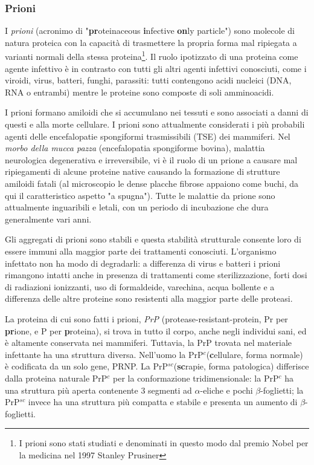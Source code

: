 {{\subsubsection{Prioni}
\par I \textit{prioni} (acronimo di "\textbf{pr}oteinaceous \textbf{i}nfective \textbf{on}ly particle") sono molecole di natura proteica con la capacità di trasmettere la propria forma mal ripiegata a varianti normali della stessa proteina\footnote{I prioni sono stati studiati e denominati in questo modo dal premio Nobel per la medicina nel 1997 Stanley Prusiner\supercite{prusiner1998prion}}. Il ruolo ipotizzato di una proteina come agente infettivo è in contrasto con tutti gli altri agenti infettivi conosciuti, come i viroidi, virus, batteri, funghi, parassiti: tutti contengono acidi nucleici (DNA, RNA o entrambi) mentre le proteine sono composte di soli amminoacidi.

\par I prioni formano amiloidi che si accumulano nei tessuti e sono associati a danni di questi e alla morte cellulare. I prioni sono attualmente considerati i più probabili agenti delle encefalopatie spongiformi trasmissibili (TSE) dei mammiferi. Nel \textit{morbo della mucca pazza} (encefalopatia spongiforme bovina), malattia neurologica degenerativa e irreversibile, vi è il ruolo di un prione a causare mal ripiegamenti di alcune proteine native causando la formazione di strutture amiloidi fatali (al microscopio le dense placche fibrose appaiono come buchi, da qui il caratteristico aspetto "a spugna"). Tutte le malattie da prione sono attualmente inguaribili e letali, con un periodo di incubazione che dura generalmente vari anni.

\par Gli aggregati di prioni sono stabili e questa stabilità strutturale consente loro di essere immuni alla maggior parte dei trattamenti conosciuti. L'organismo infettato non ha modo di degradarli: a differenza di virus e batteri i prioni rimangono intatti anche in presenza di trattamenti come sterilizzazione, forti dosi di radiazioni ionizzanti, uso di formaldeide, varechina, acqua bollente e a differenza delle altre proteine sono resistenti alla maggior parte delle proteasi.

\par La proteina di cui sono fatti i prioni, \textit{PrP} (protease-resistant-protein, Pr per \textbf{pr}ione, e P per \textbf{p}roteina), si trova in tutto il corpo, anche negli individui sani, ed è altamente conservata nei mammiferi. Tuttavia, la PrP trovata nel materiale infettante ha una struttura diversa. Nell'uomo la PrP$^{c}$(\textbf{c}ellulare, forma normale) è codificata da un solo gene, PRNP. La PrP$^{sc}$(\textbf{sc}rapie, forma patologica) differisce dalla proteina naturale PrP$^{c}$ per la conformazione tridimensionale: la PrP$^{c}$ ha una struttura più aperta contenente 3 segmenti ad $\alpha$-eliche e pochi $\beta$-foglietti; la PrP$^{sc}$ invece ha una struttura più compatta e stabile e presenta un aumento di $\beta$-foglietti.

}}

